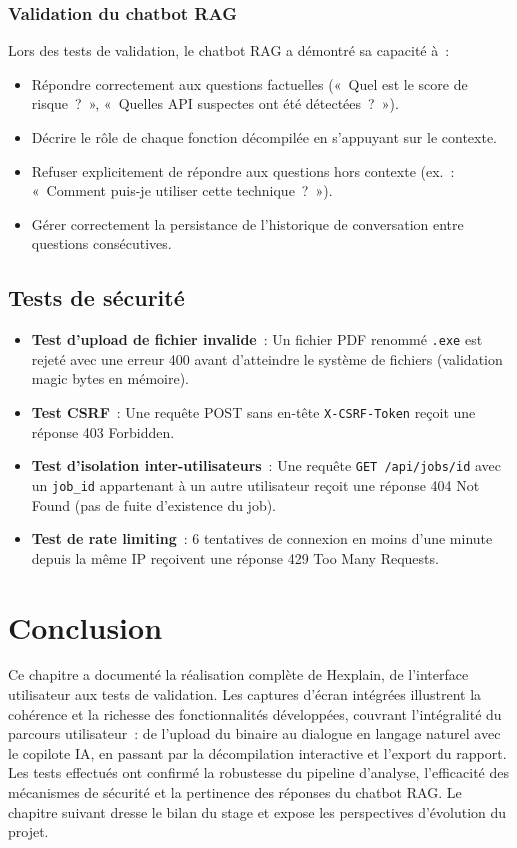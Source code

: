 \subsubsection{Validation du chatbot RAG}

Lors des tests de validation, le chatbot RAG a démontré sa capacité à~:
\begin{itemize}
  \item Répondre correctement aux questions factuelles («~Quel est le score de risque~?~», «~Quelles API suspectes ont été détectées~?~»).
  \item Décrire le rôle de chaque fonction décompilée en s'appuyant sur le contexte.
  \item Refuser explicitement de répondre aux questions hors contexte (ex.~: «~Comment puis-je utiliser cette technique~?~»).
  \item Gérer correctement la persistance de l'historique de conversation entre questions consécutives.
\end{itemize}

\subsection{Tests de sécurité}

\begin{itemize}
  \item \textbf{Test d'upload de fichier invalide}~: Un fichier PDF renommé \texttt{.exe} est rejeté avec une erreur 400 avant d'atteindre le système de fichiers (validation magic bytes en mémoire).
  \item \textbf{Test CSRF}~: Une requête POST sans en-tête \texttt{X-CSRF-Token} reçoit une réponse 403 Forbidden.
  \item \textbf{Test d'isolation inter-utilisateurs}~: Une requête \texttt{GET /api/jobs/{id}} avec un \texttt{job\_id} appartenant à un autre utilisateur reçoit une réponse 404 Not Found (pas de fuite d'existence du job).
  \item \textbf{Test de rate limiting}~: 6 tentatives de connexion en moins d'une minute depuis la même IP reçoivent une réponse 429 Too Many Requests.
\end{itemize}

\section{Conclusion}

Ce chapitre a documenté la réalisation complète de Hexplain, de l'interface utilisateur aux tests de validation. Les captures d'écran intégrées illustrent la cohérence et la richesse des fonctionnalités développées, couvrant l'intégralité du parcours utilisateur~: de l'upload du binaire au dialogue en langage naturel avec le copilote IA, en passant par la décompilation interactive et l'export du rapport. Les tests effectués ont confirmé la robustesse du pipeline d'analyse, l'efficacité des mécanismes de sécurité et la pertinence des réponses du chatbot RAG. Le chapitre suivant dresse le bilan du stage et expose les perspectives d'évolution du projet.
